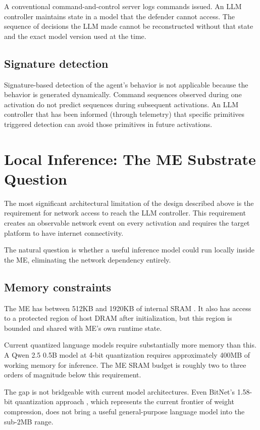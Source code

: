 \documentclass[11pt,a4paper]{article}
\begin{document}
A conventional command-and-control server logs commands issued. An LLM controller maintains state in a model that the defender cannot access. The sequence of decisions the LLM made cannot be reconstructed without that state and the exact model version used at the time.

\subsection{Signature detection}

Signature-based detection of the agent's behavior is not applicable because the behavior is generated dynamically. Command sequences observed during one activation do not predict sequences during subsequent activations. An LLM controller that has been informed (through telemetry) that specific primitives triggered detection can avoid those primitives in future activations.

\section{Local Inference: The ME Substrate Question}

The most significant architectural limitation of the design described above is the requirement for network access to reach the LLM controller. This requirement creates an observable network event on every activation and requires the target platform to have internet connectivity.

The natural question is whether a useful inference model could run locally inside the ME, eliminating the network dependency entirely.

\subsection{Memory constraints}

The ME has between 512KB and 1920KB of internal SRAM \cite{intel-csme-whitepaper}. It also has access to a protected region of host DRAM after initialization, but this region is bounded and shared with ME's own runtime state.

Current quantized language models require substantially more memory than this. A Qwen 2.5 0.5B model at 4-bit quantization requires approximately 400MB of working memory for inference. The ME SRAM budget is roughly two to three orders of magnitude below this requirement.

The gap is not bridgeable with current model architectures. Even BitNet's 1.58-bit quantization approach \cite{bitnet}, which represents the current frontier of weight compression, does not bring a useful general-purpose language model into the sub-2MB range.
\end{document}
